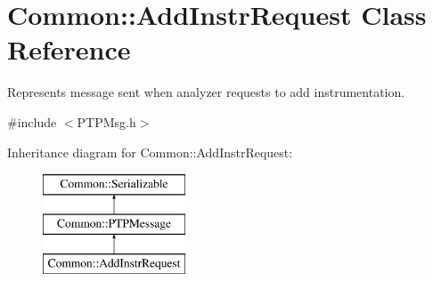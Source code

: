 \hypertarget{class_common_1_1_add_instr_request}{\section{Common\-:\-:Add\-Instr\-Request Class Reference}
\label{class_common_1_1_add_instr_request}
}


Represents message sent when analyzer requests to add instrumentation.  




{\ttfamily \#include $<$P\-T\-P\-Msg.\-h$>$}

Inheritance diagram for Common\-:\-:Add\-Instr\-Request\-:\begin{figure}[H]
\begin{center}
\leavevmode
\includegraphics[height=3.000000cm]{class_common_1_1_add_instr_request}
\end{center}
\end{figure}
